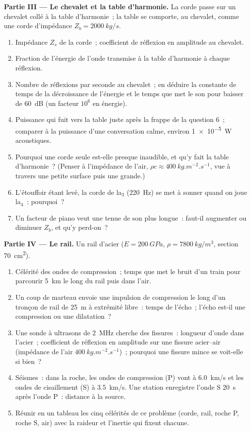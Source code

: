 \begin{problem}
\medskip
\noindent\textbf{Partie III --- Le chevalet et la table d'harmonie.}
La corde passe sur un chevalet collé à la table d'harmonie~; la table
se comporte, au chevalet, comme une corde d'impédance $Z_b = \qty{2000}{kg/s}$.
\begin{enumerate}[resume]
  \item Impédance $Z_s$ de la corde~; coefficient de réflexion en amplitude
        au chevalet.
  \item Fraction de l'énergie de l'onde transmise à la table d'harmonie à
        chaque réflexion.
  \item Nombre de réflexions par seconde au chevalet~; en déduire la constante
        de temps de la décroissance de l'énergie et le temps que met le son pour baisser
        de \qty{60}{dB} (un facteur $10^6$ en énergie).
  \item Puissance qui fuit vers la table juste après la frappe de
        la question 6~; comparer à la puissance d'une conversation calme,
        environ \qty{1e-5}{W} acoustiques.
  \item Pourquoi une corde seule est-elle presque inaudible, et qu'y fait la
        table d'harmonie~? (Penser à l'impédance de l'air,
        $\rho c \approx \qty{400}{kg.m^{-2}.s^{-1}}$, vue à travers une petite
        surface puis une grande.)
  \item L'étouffoir étant levé, la corde de la$_3$ (\qty{220}{Hz}) se met à
        sonner quand on joue la$_4$~: pourquoi~?
  \item Un facteur de piano veut une tenue de son plus longue~: faut-il augmenter ou
        diminuer $Z_b$, et qu'y perd-on~?
\end{enumerate}

\medskip
\noindent\textbf{Partie IV --- Le rail.}
Un rail d'acier ($E = \qty{200}{GPa}$, $\rho = \qty{7800}{kg/m^3}$, section
\qty{70}{cm^2}).
\begin{enumerate}[resume]
  \item Célérité des ondes de compression~; temps que met le bruit d'un train pour
        parcourir \qty{5}{km} le long du rail puis dans l'air.
  \item Un coup de marteau envoie une impulsion de compression le long d'un tronçon de rail de
        \qty{25}{m} à extrémité libre~: temps de l'écho~; l'écho est-il une
        compression ou une dilatation~?
  \item Une sonde à ultrasons de \qty{2}{MHz} cherche des fissures~: longueur d'onde dans
        l'acier~; coefficient de réflexion en amplitude sur une fissure acier--air
        (impédance de l'air $\qty{400}{kg.m^{-2}.s^{-1}}$)~; pourquoi une fissure
        mince se voit-elle si bien~?
  \item Séismes~: dans la roche, les ondes de compression (P) vont à
        \qty{6.0}{km/s} et les ondes de cisaillement (S) à \qty{3.5}{km/s}. Une station
        enregistre l'onde S \qty{20}{s} après l'onde P~: distance à la
        source.
  \item Réunir en un tableau les cinq célérités de ce problème
        (corde, rail, roche P, roche S, air) avec la raideur et
        l'inertie qui fixent chacune.
\end{enumerate}
\end{problem}
